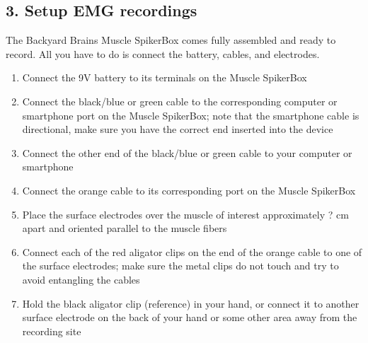 \documentclass[12pt]{article}
\begin{document}
\subsection*{3. Setup EMG recordings}

The Backyard Brains Muscle SpikerBox comes fully assembled and ready to record. All you have to do is connect the battery, cables, and electrodes.

\vspace{0.2cm}

\begin{enumerate}
\item Connect the 9V battery to its terminals on the Muscle SpikerBox
\item Connect the black/blue or green cable to the corresponding computer or smartphone port on the Muscle SpikerBox; note that the smartphone cable is directional, make sure you have the correct end inserted into the device
\item Connect the other end of the black/blue or green cable to your computer or smartphone
\item Connect the orange cable to its corresponding port on the Muscle SpikerBox
\item Place the surface electrodes over the muscle of interest approximately ? cm apart and oriented parallel to the muscle fibers
\item Connect each of the red aligator clips on the end of the orange cable to one of the surface electrodes; make sure the metal clips do not touch and try to avoid entangling the cables 
\item Hold the black aligator clip (reference) in your hand, or connect it to another surface electrode on the back of your hand or some other area away from the recording site

\vspace{0.2cm}


\end{enumerate}
\end{document}
